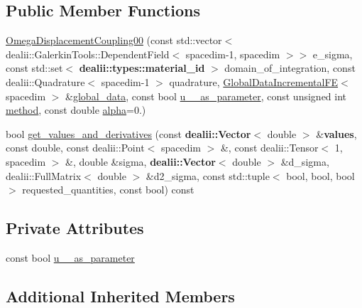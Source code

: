 \subsection*{Public Member Functions}
\begin{DoxyCompactItemize}
\item 
\hyperlink{classincremental_f_e_1_1_omega_displacement_coupling00_a2ab6b3cc56b180909d7eba7942757f1e}{Omega\+Displacement\+Coupling00} (const std\+::vector$<$ dealii\+::\+Galerkin\+Tools\+::\+Dependent\+Field$<$ spacedim-\/1, spacedim $>$$>$ e\+\_\+sigma, const std\+::set$<$ {\bf dealii\+::types\+::material\+\_\+id} $>$ domain\+\_\+of\+\_\+integration, const dealii\+::\+Quadrature$<$ spacedim-\/1 $>$ quadrature, \hyperlink{classincremental_f_e_1_1_global_data_incremental_f_e}{Global\+Data\+Incremental\+FE}$<$ spacedim $>$ \&\hyperlink{classincremental_f_e_1_1_omega_abd23d288a7a4a43f9b528be968cd2113}{global\+\_\+data}, const bool \hyperlink{classincremental_f_e_1_1_omega_displacement_coupling00_a1dc29cbc64a8477b06f1a01472783e5e}{u\+\_\+\_\+as\+\_\+parameter}, const unsigned int \hyperlink{classincremental_f_e_1_1_omega_a7600d263ebf98129629e44fa67e8a58c}{method}, const double \hyperlink{classincremental_f_e_1_1_omega_a891688560ec0ad8dc5a0058a7b400269}{alpha}=0.)
\item 
bool \hyperlink{classincremental_f_e_1_1_omega_displacement_coupling00_add2792deb962c321509264fce6fbdec5}{get\+\_\+values\+\_\+and\+\_\+derivatives} (const {\bf dealii\+::\+Vector}$<$ double $>$ \&{\bf values}, const double, const dealii\+::\+Point$<$ spacedim $>$ \&, const dealii\+::\+Tensor$<$ 1, spacedim $>$ \&, double \&sigma, {\bf dealii\+::\+Vector}$<$ double $>$ \&d\+\_\+sigma, dealii\+::\+Full\+Matrix$<$ double $>$ \&d2\+\_\+sigma, const std\+::tuple$<$ bool, bool, bool $>$ requested\+\_\+quantities, const bool) const 
\end{DoxyCompactItemize}
\subsection*{Private Attributes}
\begin{DoxyCompactItemize}
\item 
const bool \hyperlink{classincremental_f_e_1_1_omega_displacement_coupling00_a1dc29cbc64a8477b06f1a01472783e5e}{u\+\_\+\_\+as\+\_\+parameter}
\end{DoxyCompactItemize}
\subsection*{Additional Inherited Members}


